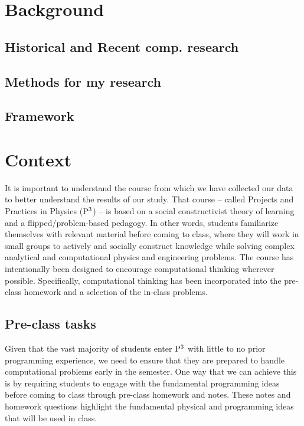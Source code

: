 \documentclass{msuphddissertation}
\begin{document}
\begin{doublespace}
%
%

\chapter{Background} %
\section{Historical and Recent comp. research}
\section{Methods for my research}
\section{Framework}

%
%
\chapter{Context}

It is important to understand the course from which we have collected our data to better understand the results of our study.  That course -- called Projects and Practices in Physics (${\rm P}^{3}$) -- is based on a social constructivist theory of learning and a flipped/problem-based pedagogy.  In other words, students familiarize themselves with relevant material before coming to class, where they will work in small groups to actively and socially construct knowledge while solving complex analytical and computational physics and engineering problems.  The course has intentionally been designed to encourage computational thinking wherever possible.  Specifically, computational thinking has been incorporated into the pre-class homework and a selection of the in-class problems.

\section{Pre-class tasks}

Given that the vast majority of students enter ${\rm P}^{3}$ with little to no prior programming experience, we need to ensure that they are prepared to handle computational problems early in the semester.  One way that we can achieve this is by requiring students to engage with the fundamental programming ideas before coming to class through pre-class homework and notes.  These notes and homework questions highlight the fundamental physical and programming ideas that will be used in class.


\end{doublespace}
\end{document}
